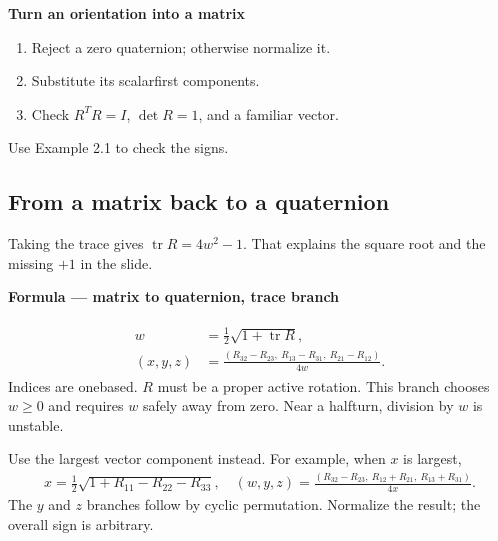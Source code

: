 \documentclass[letterpaper,11pt,english,openany,oneside]{jupyterBook}
\begin{document}
\begin{TextbookBox}
\textbf{Turn an orientation into a matrix}\par\smallskip
\begin{enumerate}
%
\item {}
\sphinxAtStartPar
Reject a zero quaternion; otherwise normalize it.

\item {}
\sphinxAtStartPar
Substitute its scalar\sphinxhyphen{}first components.

\item {}
\sphinxAtStartPar
Check \(R^TR=I\), \(\det R=1\), and a familiar vector.

\end{enumerate}

\sphinxAtStartPar
Use Example 2.1 to check the signs.

\end{TextbookBox}


\subsection{From a matrix back to a quaternion}
\label{\detokenize{lectures/lecture02/quaternions:from-a-matrix-back-to-a-quaternion}}
\sphinxAtStartPar
Taking the trace gives \(\operatorname{tr}R=4w^2-1\). That explains the square root and the missing \(+1\) in the slide.

\begin{TextbookBox}
\textbf{Formula — matrix to quaternion, trace branch}\par\smallskip
\begin{equation}\label{equation:lectures/lecture02/quaternions:eq-lec02-matrixq}
\begin{split}\begin{aligned}
w&=\tfrac12\sqrt{1+\operatorname{tr}R},\\
(x,y,z)&=\frac{(R_{32}-R_{23},\ R_{13}-R_{31},\ R_{21}-R_{12})}{4w}.
\end{aligned}\end{split}
\end{equation}
\sphinxAtStartPar
Indices are one\sphinxhyphen{}based. \(R\) must be a proper active rotation. This branch chooses \(w\ge0\) and requires \(w\) safely away from zero. Near a half\sphinxhyphen{}turn, division by \(w\) is unstable.

\sphinxAtStartPar
Use the largest vector component instead. For example, when \(x\) is largest,
\begin{equation*}
\begin{split}
x=\tfrac12\sqrt{1+R_{11}-R_{22}-R_{33}},\quad
(w,y,z)=\frac{(R_{32}-R_{23},\ R_{12}+R_{21},\ R_{13}+R_{31})}{4x}.
\end{split}
\end{equation*}
\sphinxAtStartPar
The \(y\) and \(z\) branches follow by cyclic permutation. Normalize the result; the overall sign is arbitrary.

\end{TextbookBox}
\end{document}
